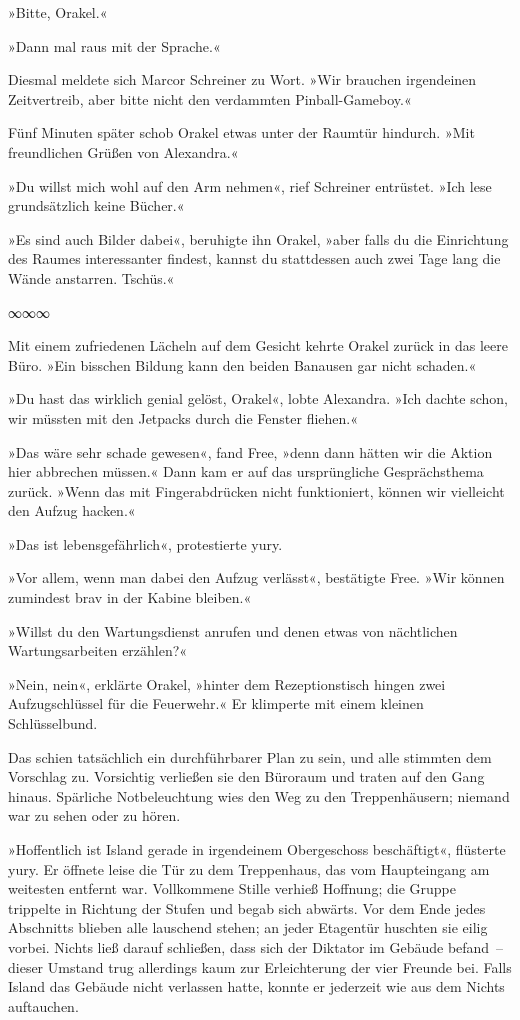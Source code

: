 »Bitte, Orakel.«

»Dann mal raus mit der Sprache.«

Diesmal meldete sich Marcor Schreiner zu Wort. »Wir brauchen irgendeinen Zeitvertreib, aber bitte nicht den verdammten Pinball-Gameboy.«

Fünf Minuten später schob Orakel etwas unter der Raumtür hindurch. »Mit freundlichen Grüßen von Alexandra.«

»Du willst mich wohl auf den Arm nehmen«, rief Schreiner entrüstet. »Ich lese grundsätzlich keine Bücher.«

»Es sind auch Bilder dabei«, beruhigte ihn Orakel, »aber falls du die Einrichtung des Raumes interessanter findest, kannst du stattdessen auch zwei Tage lang die Wände anstarren. Tschüs.«

\begin{center}
∞∞∞
\end{center}

Mit einem zufriedenen Lächeln auf dem Gesicht kehrte Orakel zurück in das leere Büro. »Ein bisschen Bildung kann den beiden Banausen gar nicht schaden.«

»Du hast das wirklich genial gelöst, Orakel«, lobte Alexandra. »Ich dachte schon, wir müssten mit den Jetpacks durch die Fenster fliehen.«

»Das wäre sehr schade gewesen«, fand Free, »denn dann hätten wir die Aktion hier abbrechen müssen.« Dann kam er auf das ursprüngliche Gesprächsthema zurück. »Wenn das mit Fingerabdrücken nicht funktioniert, können wir vielleicht den Aufzug hacken.«

»Das ist lebensgefährlich«, protestierte yury.

»Vor allem, wenn man dabei den Aufzug verlässt«, bestätigte Free. »Wir können zumindest brav in der Kabine bleiben.«

»Willst du den Wartungsdienst anrufen und denen etwas von nächtlichen Wartungsarbeiten erzählen?«

»Nein, nein«, erklärte Orakel, »hinter dem Rezeptionstisch hingen zwei Aufzugschlüssel für die Feuerwehr.« Er klimperte mit einem kleinen Schlüsselbund.

Das schien tatsächlich ein durchführbarer Plan zu sein, und alle stimmten dem Vorschlag zu. Vorsichtig verließen sie den Büroraum und traten auf den Gang hinaus. Spärliche Notbeleuchtung wies den Weg zu den Treppenhäusern; niemand war zu sehen oder zu hören.

»Hoffentlich ist Island gerade in irgendeinem Obergeschoss beschäftigt«, flüsterte yury. Er öffnete leise die Tür zu dem Treppenhaus, das vom Haupteingang am weitesten entfernt war. Vollkommene Stille verhieß Hoffnung; die Gruppe trippelte in Richtung der Stufen und begab sich abwärts. Vor dem Ende jedes Abschnitts blieben alle lauschend stehen; an jeder Etagentür huschten sie eilig vorbei. Nichts ließ darauf schließen, dass sich der Diktator im Gebäude befand~– dieser Umstand trug allerdings kaum zur Erleichterung der vier Freunde bei. Falls Island das Gebäude nicht verlassen hatte, konnte er jederzeit wie aus dem Nichts auftauchen.

